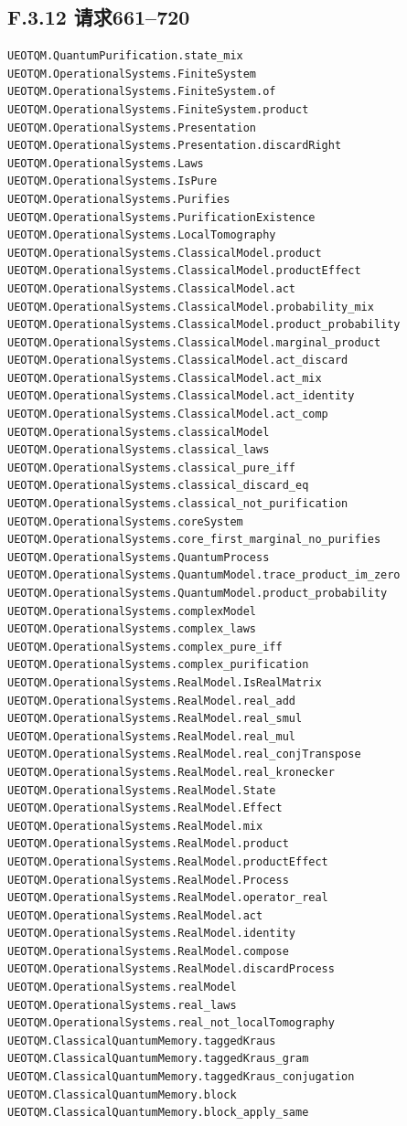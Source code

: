 \documentclass[
  11pt,
  oneside]{book}
\begin{document}
\hypertarget{f.3.12-ux8bf7ux6c42661720}{%
\subsection{F.3.12 请求661--720}\label{f.3.12-ux8bf7ux6c42661720}}

\begin{Verbatim}[breaklines,breakanywhere,fontsize=\scriptsize]
UEOTQM.QuantumPurification.state_mix
UEOTQM.OperationalSystems.FiniteSystem
UEOTQM.OperationalSystems.FiniteSystem.of
UEOTQM.OperationalSystems.FiniteSystem.product
UEOTQM.OperationalSystems.Presentation
UEOTQM.OperationalSystems.Presentation.discardRight
UEOTQM.OperationalSystems.Laws
UEOTQM.OperationalSystems.IsPure
UEOTQM.OperationalSystems.Purifies
UEOTQM.OperationalSystems.PurificationExistence
UEOTQM.OperationalSystems.LocalTomography
UEOTQM.OperationalSystems.ClassicalModel.product
UEOTQM.OperationalSystems.ClassicalModel.productEffect
UEOTQM.OperationalSystems.ClassicalModel.act
UEOTQM.OperationalSystems.ClassicalModel.probability_mix
UEOTQM.OperationalSystems.ClassicalModel.product_probability
UEOTQM.OperationalSystems.ClassicalModel.marginal_product
UEOTQM.OperationalSystems.ClassicalModel.act_discard
UEOTQM.OperationalSystems.ClassicalModel.act_mix
UEOTQM.OperationalSystems.ClassicalModel.act_identity
UEOTQM.OperationalSystems.ClassicalModel.act_comp
UEOTQM.OperationalSystems.classicalModel
UEOTQM.OperationalSystems.classical_laws
UEOTQM.OperationalSystems.classical_pure_iff
UEOTQM.OperationalSystems.classical_discard_eq
UEOTQM.OperationalSystems.classical_not_purification
UEOTQM.OperationalSystems.coreSystem
UEOTQM.OperationalSystems.core_first_marginal_no_purifies
UEOTQM.OperationalSystems.QuantumProcess
UEOTQM.OperationalSystems.QuantumModel.trace_product_im_zero
UEOTQM.OperationalSystems.QuantumModel.product_probability
UEOTQM.OperationalSystems.complexModel
UEOTQM.OperationalSystems.complex_laws
UEOTQM.OperationalSystems.complex_pure_iff
UEOTQM.OperationalSystems.complex_purification
UEOTQM.OperationalSystems.RealModel.IsRealMatrix
UEOTQM.OperationalSystems.RealModel.real_add
UEOTQM.OperationalSystems.RealModel.real_smul
UEOTQM.OperationalSystems.RealModel.real_mul
UEOTQM.OperationalSystems.RealModel.real_conjTranspose
UEOTQM.OperationalSystems.RealModel.real_kronecker
UEOTQM.OperationalSystems.RealModel.State
UEOTQM.OperationalSystems.RealModel.Effect
UEOTQM.OperationalSystems.RealModel.mix
UEOTQM.OperationalSystems.RealModel.product
UEOTQM.OperationalSystems.RealModel.productEffect
UEOTQM.OperationalSystems.RealModel.Process
UEOTQM.OperationalSystems.RealModel.operator_real
UEOTQM.OperationalSystems.RealModel.act
UEOTQM.OperationalSystems.RealModel.identity
UEOTQM.OperationalSystems.RealModel.compose
UEOTQM.OperationalSystems.RealModel.discardProcess
UEOTQM.OperationalSystems.realModel
UEOTQM.OperationalSystems.real_laws
UEOTQM.OperationalSystems.real_not_localTomography
UEOTQM.ClassicalQuantumMemory.taggedKraus
UEOTQM.ClassicalQuantumMemory.taggedKraus_gram
UEOTQM.ClassicalQuantumMemory.taggedKraus_conjugation
UEOTQM.ClassicalQuantumMemory.block
UEOTQM.ClassicalQuantumMemory.block_apply_same
\end{Verbatim}
\end{document}
